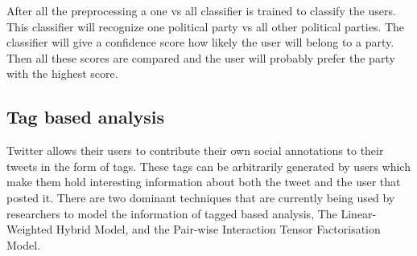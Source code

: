 \documentclass{article}
\begin{document}
After all the preprocessing a one vs all classifier is trained to classify the users. This classifier will recognize one political party vs all other political parties. The classifier will give a confidence score how likely the user will belong to a party. Then all these scores are compared and the user will probably prefer the party with the highest score.  \cite{pol}
\subsection{Tag based analysis}

Twitter allows their users to contribute their own social annotations to their tweets in the form of tags. These tags can be arbitrarily generated by users 
which make them hold interesting information about both the tweet and the user that posted it. There are two dominant techniques that are currently being
used by researchers to model the information of tagged based analysis, The Linear-Weighted Hybrid Model, and the Pair-wise Interaction Tensor Factorisation Model\cite{TagBased}.
\end{document}
